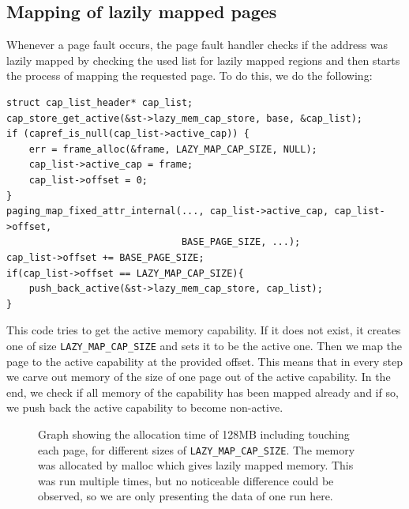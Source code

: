\subsection{Mapping of lazily mapped pages}

Whenever a page fault occurs, the page fault handler checks if the address was lazily mapped by checking the used list for lazily mapped regions and then starts the process of mapping the requested page.
To do this, we do the following:
\begin{verbatim}
struct cap_list_header* cap_list;
cap_store_get_active(&st->lazy_mem_cap_store, base, &cap_list);
if (capref_is_null(cap_list->active_cap)) {
    err = frame_alloc(&frame, LAZY_MAP_CAP_SIZE, NULL);
    cap_list->active_cap = frame;
    cap_list->offset = 0;
}
paging_map_fixed_attr_internal(..., cap_list->active_cap, cap_list->offset, 
                               BASE_PAGE_SIZE, ...);
cap_list->offset += BASE_PAGE_SIZE;
if(cap_list->offset == LAZY_MAP_CAP_SIZE){
    push_back_active(&st->lazy_mem_cap_store, cap_list);
}
\end{verbatim}
This code tries to get the active memory capability. If it does not exist, it creates one of size \texttt{LAZY_MAP_CAP_SIZE} and sets it to be the active one. 
Then we map the page to the active capability at the provided offset. This means that in every step we carve out memory of the size of one page out of the active capability.
In the end, we check if all memory of the capability has been mapped already and if so, we push back the active capability to become non-active. 

\begin{figure}[ht]
    \centering
    \scalebox{0.7}{ }

    \caption{Graph showing the allocation time of 128MB including touching each page, for different sizes of \texttt{LAZY_MAP_CAP_SIZE}. The memory was allocated by malloc which gives lazily mapped memory. This was run multiple times, but no noticeable difference could be observed, so we are only presenting the data of one run here.}
    \label{fig:lazy_map}
\end{figure}

